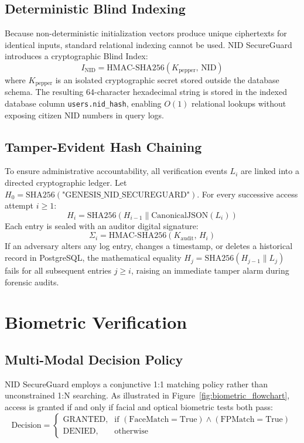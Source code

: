 \documentclass[11pt,a4paper]{article}
\begin{document}
\subsection{Deterministic Blind Indexing}
Because non-deterministic initialization vectors produce unique ciphertexts for identical inputs, standard relational indexing cannot be used. NID SecureGuard introduces a cryptographic Blind Index:
\begin{equation}
I_{\text{NID}} = \text{HMAC-SHA256}\left( K_{\text{pepper}}, \, \text{NID} \right)
\label{eq:blind}
\end{equation}
where $K_{\text{pepper}}$ is an isolated cryptographic secret stored outside the database schema. The resulting 64-character hexadecimal string is stored in the indexed database column \texttt{users.nid\_hash}, enabling $O(1)$ relational lookups without exposing citizen NID numbers in query logs.

\subsection{Tamper-Evident Hash Chaining}
To ensure administrative accountability, all verification events $L_i$ are linked into a directed cryptographic ledger. Let $H_0 = \text{SHA256}(\text{"GENESIS\_NID\_SECUREGUARD"})$. For every successive access attempt $i \ge 1$:
\begin{equation}
H_i = \text{SHA256}\left( H_{i-1} \parallel \text{CanonicalJSON}(L_i) \right)
\label{eq:chain}
\end{equation}
Each entry is sealed with an auditor digital signature:
\begin{equation}
\Sigma_i = \text{HMAC-SHA256}\left( K_{\text{audit}}, \, H_i \right)
\label{eq:seal}
\end{equation}
If an adversary alters any log entry, changes a timestamp, or deletes a historical record in PostgreSQL, the mathematical equality $H_j = \text{SHA256}(H_{j-1} \parallel L_j)$ fails for all subsequent entries $j \ge i$, raising an immediate tamper alarm during forensic audits.

\section{Biometric Verification}

\subsection{Multi-Modal Decision Policy}
NID SecureGuard employs a conjunctive 1:1 matching policy rather than unconstrained 1:N searching. As illustrated in Figure~\ref{fig:biometric_flowchart}, access is granted if and only if facial and optical biometric tests both pass:
\begin{equation}
\text{Decision} = 
\begin{cases}
\text{GRANTED}, & \text{if } (\text{FaceMatch} = \text{True}) \land (\text{FPMatch} = \text{True}) \\
\text{DENIED},  & \text{otherwise}
\end{cases}
\label{eq:decision}
\end{equation}
\end{document}
